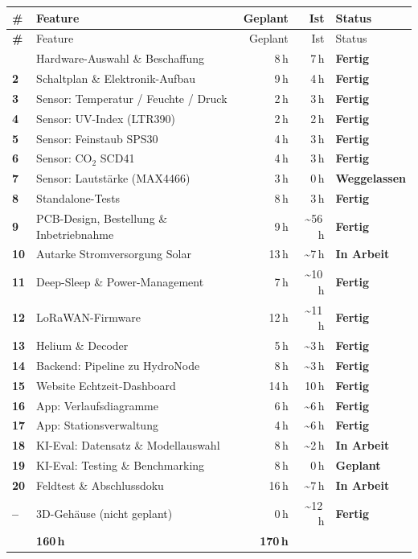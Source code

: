 \documentclass[11pt,a4paper]{scrartcl}
\newcommand{\status}[1]{%
  \ifstrequal{#1}{Fertig}{\textcolor{colgreen}{\textbf{Fertig}}}{}%
  \ifstrequal{#1}{In Arbeit}{\textcolor{colorange}{\textbf{In Arbeit}}}{}%
  \ifstrequal{#1}{Geplant}{\textcolor{colblue}{\textbf{Geplant}}}{}%
  \ifstrequal{#1}{Weggelassen}{\textcolor{colred}{\textbf{Weggelassen}}}{}%
}
\begin{document}
\begin{longtable}{>{\bfseries}p{0.5cm} p{7.5cm} r r l}
  \toprule
  \# & Feature & Geplant & Ist & Status \\
  \midrule
  \endfirsthead
  \toprule
  \# & Feature & Geplant & Ist & Status \\
  \midrule
  \endhead
  \bottomrule
  \endlastfoot
  1  & Hardware-Auswahl \& Beschaffung & 8\,h & 7\,h & \status{Fertig} \\
  \rowcolor{rowgray}
  2  & Schaltplan \& Elektronik-Aufbau & 9\,h & 4\,h & \status{Fertig} \\
  3  & Sensor: Temperatur / Feuchte / Druck & 2\,h & 3\,h & \status{Fertig} \\
  \rowcolor{rowgray}
  4  & Sensor: UV-Index (LTR390) & 2\,h & 2\,h & \status{Fertig} \\
  5  & Sensor: Feinstaub SPS30 & 4\,h & 3\,h & \status{Fertig} \\
  \rowcolor{rowgray}
  6  & Sensor: CO$_2$ SCD41 & 4\,h & 3\,h & \status{Fertig} \\
  7  & Sensor: Lautstärke (MAX4466) & 3\,h & 0\,h & \status{Weggelassen} \\
  \rowcolor{rowgray}
  8  & Standalone-Tests & 8\,h & 3\,h & \status{Fertig} \\
  9  & PCB-Design, Bestellung \& Inbetriebnahme & 9\,h & \textasciitilde56\,h & \status{Fertig} \\
  \rowcolor{rowgray}
  10 & Autarke Stromversorgung Solar & 13\,h & \textasciitilde7\,h & \status{In Arbeit} \\
  11 & Deep-Sleep \& Power-Management & 7\,h & \textasciitilde10\,h & \status{Fertig} \\
  \rowcolor{rowgray}
  12 & LoRaWAN-Firmware & 12\,h & \textasciitilde11\,h & \status{Fertig} \\
  13 & Helium \& Decoder & 5\,h & \textasciitilde3\,h & \status{Fertig} \\
  \rowcolor{rowgray}
  14 & Backend: Pipeline zu HydroNode & 8\,h & \textasciitilde3\,h & \status{Fertig} \\
  15 & Website Echtzeit-Dashboard & 14\,h & 10\,h & \status{Fertig} \\
  \rowcolor{rowgray}
  16 & App: Verlaufsdiagramme & 6\,h & \textasciitilde6\,h & \status{Fertig} \\
  17 & App: Stationsverwaltung & 4\,h & \textasciitilde6\,h & \status{Fertig} \\
  \rowcolor{rowgray}
  18 & KI-Eval: Datensatz \& Modellauswahl & 8\,h & \textasciitilde2\,h & \status{In Arbeit} \\
  19 & KI-Eval: Testing \& Benchmarking & 8\,h & 0\,h & \status{Geplant} \\
  \rowcolor{rowgray}
  20 & Feldtest \& Abschlussdoku & 16\,h & \textasciitilde7\,h & \status{In Arbeit} \\
  -- & 3D-Gehäuse (nicht geplant) & 0\,h & \textasciitilde12\,h & \status{Fertig} \\
  \midrule
  \multicolumn{2}{l}{\textbf{Gesamt}} & \textbf{160\,h} & \textbf{170\,h} & \\
\end{longtable}
\end{document}
